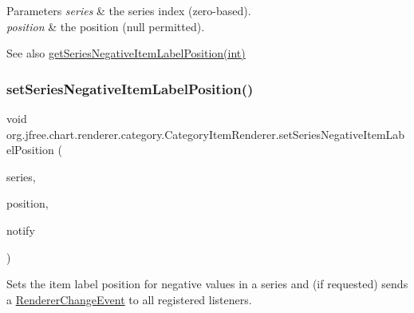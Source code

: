 \begin{DoxyParams}{Parameters}
{\em series} & the series index (zero-\/based). \\
\hline
{\em position} & the position ({\ttfamily null} permitted).\\
\hline
\end{DoxyParams}
\begin{DoxySeeAlso}{See also}
\mbox{\hyperlink{interfaceorg_1_1jfree_1_1chart_1_1renderer_1_1category_1_1_category_item_renderer_a4d25d81d8fd4ce5d4b18f49663039e49}{get\+Series\+Negative\+Item\+Label\+Position(int)}} 
\end{DoxySeeAlso}
\mbox{\label{interfaceorg_1_1jfree_1_1chart_1_1renderer_1_1category_1_1_category_item_renderer_a7f6bb08d17061232916f217b732f9ef6}} 
\subsubsection{\texorpdfstring{set\+Series\+Negative\+Item\+Label\+Position()}{setSeriesNegativeItemLabelPosition()}\hspace{0.1cm}{\footnotesize\ttfamily [2/2]}}
{\footnotesize\ttfamily void org.\+jfree.\+chart.\+renderer.\+category.\+Category\+Item\+Renderer.\+set\+Series\+Negative\+Item\+Label\+Position (\begin{DoxyParamCaption}\item[{int}]{series,  }\item[{\mbox{\hyperlink{classorg_1_1jfree_1_1chart_1_1labels_1_1_item_label_position}{Item\+Label\+Position}}}]{position,  }\item[{boolean}]{notify }\end{DoxyParamCaption})}

Sets the item label position for negative values in a series and (if requested) sends a \mbox{\hyperlink{}{Renderer\+Change\+Event}} to all registered listeners.


